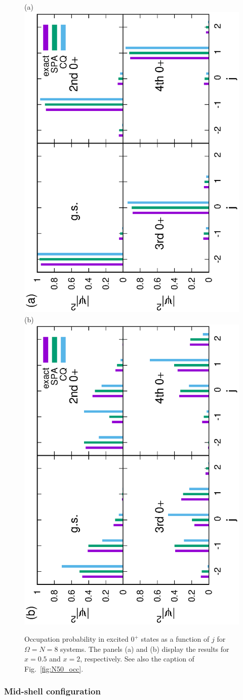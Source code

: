 \documentclass[%
superscriptaddress,
preprint,
showpacs,
nofootinbib,
amsmath,amssymb,
aps,
prc,
floatfix ]%
{revtex4-1}
\begin{document}
\begin{figure}[htbp]
 \begin{minipage}{1\hsize}
 \begin{center}
 (a)  \includegraphics[height=0.46\textwidth,angle=-90]{N8Xeq0p5occ_wo_adiabatic.eps}
 (b)  \includegraphics[height=0.46\textwidth,angle=-90]{N8Xeq2occ_wo_adiabatic.eps}
 \end{center}
 \end{minipage}
 \caption{
Occupation probability in excited $0^+$ states
as a function of $j$ for $\Omega=N=8$ systems.
The panels (a) and (b) display the results for $x=0.5$ and $x=2$,
respectively. 
See also the caption of Fig.~\ref{fig:N50_occ}.
}
 \label{fig:N8_occ}
\end{figure}


\subsubsection{Mid-shell configuration}
\end{document}

